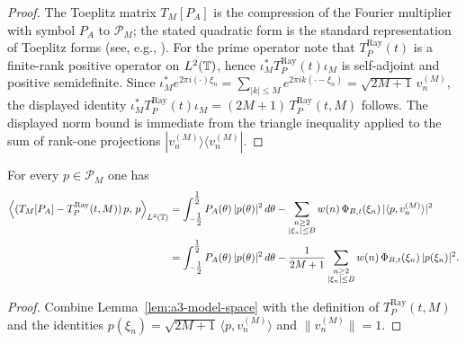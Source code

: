 \begin{proof}
The Toeplitz matrix $T_M[P_A]$ is the compression of the Fourier multiplier with
symbol $P_A$ to $\mathcal P_M$; the stated quadratic form is the standard representation
of Toeplitz forms (see, e.g., \cite[Chapter~1]{GrenanderSzego1958}).  For the prime
operator note that $T_P^{\mathrm{Ray}}(t)$ is a finite-rank positive operator on $L^2(\mathbb T)$,
hence $\iota_M^\ast T_P^{\mathrm{Ray}}(t) \iota_M$ is self-adjoint and positive semidefinite. Since
$\iota_M^\ast e^{2\pi i(\cdot)\xi_n}=\sum_{|k|\le M}e^{2\pi i k(\cdot-\xi_n)}=\sqrt{2M+1}\,v_n^{(M)}$,
the displayed identity $\iota_M^\ast T_P^{\mathrm{Ray}}(t) \iota_M=(2M+1)\,T_P^{\mathrm{Ray}}(t,M)$ follows.
The displayed norm bound is immediate from the triangle inequality applied to
the sum of rank-one projections $|v_n^{(M)}\rangle\!\langle v_n^{(M)}|$.
\end{proof}

\begin{lemma}\label{lem:a3-rayleigh-quotient}
For every $p\in\mathcal P_M$ one has
\begin{align*}
  \left\langle (T_M[P_A]-T_P^{\mathrm{Ray}}(t,M))\,p,\,p\right\rangle_{L^2(\mathbb T)}
  &= \int_{-\tfrac12}^{\tfrac12} P_A(\theta)\,|p(\theta)|^2\,d\theta
    - \sum_{\substack{n\ge2\\ |\xi_n|\le B}} w(n)\,\Phi_{B,t}(\xi_n)\,|\langle p,v_n^{(M)}\rangle|^2 \\
  &= \int_{-\tfrac12}^{\tfrac12} P_A(\theta)\,|p(\theta)|^2\,d\theta
    - \frac{1}{2M+1}\sum_{\substack{n\ge2\\ |\xi_n|\le B}} w(n)\,\Phi_{B,t}(\xi_n)\,|p(\xi_n)|^2.
\end{align*}
\end{lemma}

\begin{proof}
Combine Lemma~\ref{lem:a3-model-space} with the definition of $T_P^{\mathrm{Ray}}(t,M)$ and the identities
$p(\xi_n)=\sqrt{2M+1}\,\langle p,v_n^{(M)}\rangle$ and $\|v_n^{(M)}\|=1$.
\end{proof}

